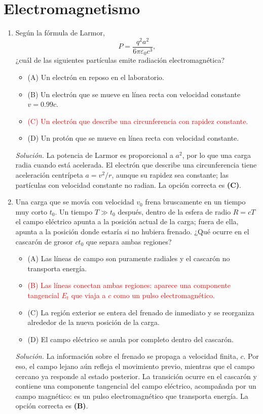 \documentclass[11pt]{article}
\begin{document}
\section{Electromagnetismo}
\begin{enumerate}
    \item Según la fórmula de Larmor,
    \[
        P=\frac{q^2a^2}{6\pi\varepsilon_0c^3},
    \]
    ¿cuál de las siguientes partículas emite radiación electromagnética?
    \begin{itemize}
        \item (A) Un electrón en reposo en el laboratorio.
        \item (B) Un electrón que se mueve en línea recta con velocidad constante $v=0.99c$.
        \item \textcolor{red}{(C) Un electrón que describe una circunferencia con rapidez constante.}
        \item (D) Un protón que se mueve en línea recta con velocidad constante.
    \end{itemize}
    \textit{Solución.} La potencia de Larmor es proporcional a $a^2$, por lo que una carga radia cuando está acelerada. El electrón que describe una circunferencia tiene aceleración centrípeta $a=v^2/r$, aunque su rapidez sea constante; las partículas con velocidad constante no radian. La opción correcta es \textbf{(C)}. \parencite{chaparro2026}

    \item Una carga que se movía con velocidad $v_0$ frena bruscamente en un tiempo muy corto $t_0$. Un tiempo $T\gg t_0$ después, dentro de la esfera de radio $R=cT$ el campo eléctrico apunta a la posición actual de la carga; fuera de ella, apunta a la posición donde estaría si no hubiera frenado. ¿Qué ocurre en el cascarón de grosor $ct_0$ que separa ambas regiones?
    \begin{itemize}
        \item (A) Las líneas de campo son puramente radiales y el cascarón no transporta energía.
        \item \textcolor{red}{(B) Las líneas conectan ambas regiones: aparece una componente tangencial $E_t$ que viaja a $c$ como un pulso electromagnético.}
        \item (C) La región exterior se entera del frenado de inmediato y se reorganiza alrededor de la nueva posición de la carga.
        \item (D) El campo eléctrico se anula por completo dentro del cascarón.
    \end{itemize}
    \textit{Solución.} La información sobre el frenado se propaga a velocidad finita, $c$. Por eso, el campo lejano aún refleja el movimiento previo, mientras que el campo cercano ya responde al estado posterior. La transición ocurre en el cascarón y contiene una componente tangencial del campo eléctrico, acompañada por un campo magnético: es un pulso electromagnético que transporta energía. La opción correcta es \textbf{(B)}. \parencite{chaparro2026}


\end{enumerate}
\end{document}

